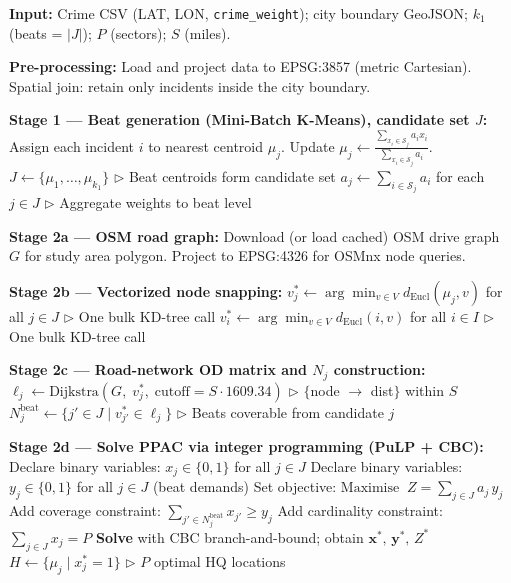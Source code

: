 \documentclass[12pt]{article}
\begin{document}
\begin{algorithm}[H]
\caption{Road-Network PPAC Extension --- Integer Programming Pipeline}
\begin{algorithmic}[1]
\State \textbf{Input:} Crime CSV (LAT, LON, \texttt{crime\_weight}); city boundary
       GeoJSON; $k_1$ (beats = $|J|$); $P$ (sectors); $S$ (miles).

\State \textbf{Pre-processing:}
    \Statex \quad Load and project data to EPSG:3857 (metric Cartesian).
    \Statex \quad Spatial join: retain only incidents inside the city boundary.

\State \textbf{Stage 1 --- Beat generation (Mini-Batch K-Means), candidate set $J$:}
    \Repeat
        \State Assign each incident $i$ to nearest centroid $\mu_j$.
        \State Update $\mu_j \leftarrow \frac{\sum_{x_i \in \mathcal{S}_j} a_i x_i}
                                              {\sum_{x_i \in \mathcal{S}_j} a_i}$.
    \State $J \leftarrow \{\mu_1, \dots, \mu_{k_1}\}$  \hfill
           $\triangleright$ Beat centroids form candidate set
    \State $a_j \leftarrow \sum_{i \in \mathcal{S}_j} a_i$ for each $j \in J$
           \hfill $\triangleright$ Aggregate weights to beat level

\State \textbf{Stage 2a --- OSM road graph:}
    \Statex \quad Download (or load cached) OSM drive graph $G$ for study area polygon.
    \Statex \quad Project to EPSG:4326 for OSMnx node queries.

\State \textbf{Stage 2b --- Vectorized node snapping:}
    \Statex \quad $v^*_j \leftarrow \arg\min_{v \in V} d_{\mathrm{Eucl}}(\mu_j, v)$
               for all $j \in J$ \hfill $\triangleright$ One bulk KD-tree call
    \Statex \quad $v^*_i \leftarrow \arg\min_{v \in V} d_{\mathrm{Eucl}}(i, v)$
               for all $i \in I$ \hfill $\triangleright$ One bulk KD-tree call

\State \textbf{Stage 2c --- Road-network OD matrix and $N_j$ construction:}
        \State $\ell_j \leftarrow \text{Dijkstra}(G,\; v^*_j,\; \text{cutoff}=S \cdot 1609.34)$
               \hfill $\triangleright$ $\{$node $\to$ dist$\}$ within $S$
        \State $N_j^{\text{beat}} \leftarrow \{j' \in J \mid v^*_{j'} \in \ell_j\}$
               \hfill $\triangleright$ Beats coverable from candidate $j$
    \EndFor

\State \textbf{Stage 2d --- Solve PPAC via integer programming (PuLP + CBC):}
    \State Declare binary variables: $x_j \in \{0,1\}$ for all $j \in J$
    \State Declare binary variables: $y_j \in \{0,1\}$ for all $j \in J$ (beat demands)
    \State Set objective: $\text{Maximise}\;\; Z = \sum_{j \in J} a_j \, y_j$
        \State Add coverage constraint: $\sum_{j' \in N_j^{\text{beat}}} x_{j'} \ge y_j$
    \EndFor
    \State Add cardinality constraint: $\sum_{j \in J} x_j = P$
    \State \textbf{Solve} with CBC branch-and-bound; obtain $\mathbf{x}^*,\, \mathbf{y}^*,\, Z^*$
    \State $H \leftarrow \{\mu_j \mid x^*_j = 1\}$
           \hfill $\triangleright$ $P$ optimal HQ locations


\end{algorithmic}
\end{algorithm}
\end{document}

